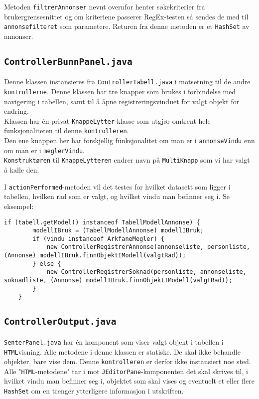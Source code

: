 Metoden \texttt{filtrerAnnonser} nevnt overnfor henter søkekriterier fra brukergrensesnittet og om kriteriene passerer RegEx-testen så sendes de med til \texttt{annonsefilteret} som parametere. Returen fra denne metoden er et \texttt{HashSet} av annonser.


\subsection{\texttt{ControllerBunnPanel.java}}
Denne klassen instansieres fra \texttt{ControllerTabell.java} i motsetning til de andre \texttt{kontrollerne}. Denne klassen har tre knapper som brukes i forbindelse med navigering i tabellen, samt til å åpne registreringsvinduet for valgt objekt for endring. \\
Klassen har én privat \texttt{KnappeLytter}-klasse som utgjør omtrent hele funksjonaliteten til denne \texttt{kontrolleren}. \\
Den ene knappen her har forskjellig funksjonalitet om man er i \texttt{annonseVindu} enn om man er i \texttt{meglerVindu}. \\
\texttt{Konstruktøren} til \texttt{KnappeLytteren} endrer navn på \texttt{MultiKnapp} som vi har valgt å kalle den. 

I \texttt{actionPerformed}-metoden vil det testes for hvilket datasett som ligger i tabellen, hvilken rad som er valgt, og hvilket vindu man befinner seg i. Se eksempel:

\begin{lstlisting}[caption=Utdrag fra \texttt{actionPerformed}-metoden i \texttt{ControllerBunnPanel.java}]
    if (tabell.getModel() instanceof TabellModellAnnonse) {
        modellIBruk = (TabellModellAnnonse) modellIBruk;
        if (vindu instanceof ArkfaneMegler) {
            new ControllerRegistrerAnnonse(annonseliste, personliste, (Annonse) modellIBruk.finnObjektIModell(valgtRad));
        } else {
            new ControllerRegistrerSoknad(personliste, annonseliste, soknadliste, (Annonse) modellIBruk.finnObjektIModell(valgtRad));
        }
    }
\end{lstlisting}

\subsection{\texttt{ControllerOutput.java}} \label{subsec:contout}
\texttt{SenterPanel.java} har én komponent som viser valgt objekt i tabellen i \texttt{HTML}visning. Alle metodene i denne klassen er statiske. De skal ikke behandle objekter, bare vise dem. Denne \texttt{kontrolleren} er derfor ikke instansiert noe sted. \\
Alle "\texttt{HTML}-metodene" tar i mot \texttt{JEditorPane}-komponenten det skal skrives til, i hvilket vindu man befinner seg i, objektet som skal vises og eventuelt et eller flere \texttt{HashSet} om en trenger ytterligere informasjon i utskriften.

